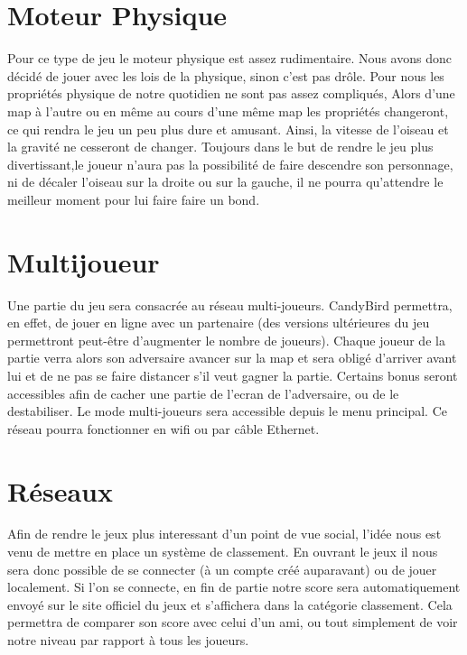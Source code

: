 \documentclass [11pt]{report}
\begin{document}
	\section {Moteur Physique}
			Pour ce type de jeu le moteur physique est assez rudimentaire. Nous avons donc décidé de jouer avec les lois de la physique, sinon c'est pas drôle. Pour nous les propriétés physique de notre quotidien ne sont pas assez compliqués, Alors d'une map à l'autre ou en même au cours d'une même map les propriétés 				changeront, ce qui rendra le jeu un peu plus dure et amusant. Ainsi, la vitesse de l'oiseau et la gravité ne cesseront de changer. Toujours dans le but de rendre le jeu plus divertissant,le joueur n'aura pas la possibilité de faire descendre son personnage, ni de décaler l'oiseau sur la droite ou sur la gauche, il ne pourra qu'attendre le meilleur 	moment pour lui faire faire un bond.\\\vspace{2mm}


\section {Multijoueur}
		Une partie du jeu sera consacrée au réseau multi-joueurs. CandyBird permettra, en effet, de jouer en ligne avec un partenaire (des versions ultérieures du jeu permettront peut-être d'augmenter le nombre de joueurs). Chaque joueur de la partie verra alors son adversaire avancer sur la map et sera obligé d'arriver avant lui et de ne pas se faire distancer s’il veut gagner la partie. Certains bonus seront accessibles afin de cacher une partie de l'ecran de l'adversaire, ou de le destabiliser. Le mode multi-joueurs sera accessible depuis le menu principal. Ce réseau pourra fonctionner en wifi ou par câble Ethernet. \\ \vspace{5mm}



	\section {Réseaux}
		Afin de rendre le jeux plus interessant d'un point de vue social, l'idée nous est venu de mettre en place un système de classement. En ouvrant le jeux il nous sera donc possible de se connecter (à un compte créé auparavant) ou de jouer localement. Si l'on se connecte, en fin de partie notre score sera automatiquement envoyé sur le site officiel du jeux et s'affichera dans la catégorie classement. Cela permettra de comparer son score avec celui d'un ami, ou tout simplement de voir notre niveau par rapport à tous les joueurs.\\\vspace{3mm}
\end{document}
